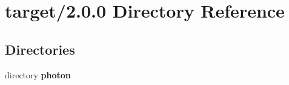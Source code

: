 \section{target/2.0.0 Directory Reference}
\label{dir_42e987b143569be0616effef51cafceb}
\subsection*{Directories}
\begin{DoxyCompactItemize}
\item 
directory \textbf{ photon}
\end{DoxyCompactItemize}
